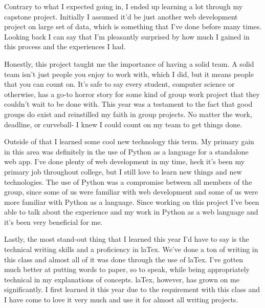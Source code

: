\par Contrary to what I expected going in, I ended up learning a lot through my capstone project.
Initially I assumed it'd be just another web development project on large set of data, which is something that I've done before many times.
Looking back I can say that I'm pleasantly surprised by how much I gained in this process and the experiences I had.

\par Honestly, this project taught me the importance of having a solid team.
A solid team isn't just people you enjoy to work with, which I did, but it means people that you can count on.
It's safe to say every student, computer science or otherwise, has a go-to horror story for some kind of group work project that they couldn't wait to be done with.
This year was a testament to the fact that good groups do exist and reinstilled my faith in group projects.
No matter the work, deadline, or curveball- I knew I could count on my team to get things done.

\par Outside of that I learned some cool new technology this term.
My primary gain in this area was definitely in the use of Python as a language for a standalone web app.
I've done plenty of web development in my time, heck it's been my primary job throughout college, but I still love to learn new things and new technologies.
The use of Python was a compromise between all members of the group, since some of us were familiar with web development and some of us were more familiar with Python as a language.
Since working on this project I've been able to talk about the experience and my work in Python as a web language and it's been very beneficial for me.

\par Lastly, the most stand-out thing that I learned this year I'd have to say is the technical writing skills and a proficiency in laTex.
We've done a ton of writing in this class and almost all of it was done through the use of laTex.
I've gotten much better at putting words to paper, so to speak, while being appropriately technical in my explanations of concepts.
laTex, however, has grown on me significantly.
I first learned it this year due to the requirement with this class and I have come to love it very much and use it for almost all writing projects.

